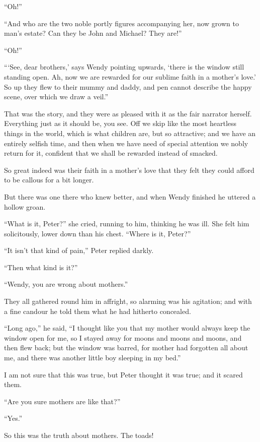 ``Oh!''

``And who are the two noble portly figures accompanying her, now grown
to man's estate? Can they be John and Michael? They are!''

``Oh!''

``‘See, dear brothers,' says Wendy pointing upwards, ‘there is the
window still standing open. Ah, now we are rewarded for our sublime
faith in a mother's love.' So up they flew to their mummy and daddy,
and pen cannot describe the happy scene, over which we draw a veil.''

That was the story, and they were as pleased with it as the fair
narrator herself. Everything just as it should be, you see. Off we skip
like the most heartless things in the world, which is what children
are, but so attractive; and we have an entirely selfish time, and then
when we have need of special attention we nobly return for it,
confident that we shall be rewarded instead of smacked.

So great indeed was their faith in a mother's love that they felt they
could afford to be callous for a bit longer.

But there was one there who knew better, and when Wendy finished he
uttered a hollow groan.

``What is it, Peter?'' she cried, running to him, thinking he was ill.
She felt him solicitously, lower down than his chest. ``Where is it,
Peter?''

``It isn't that kind of pain,'' Peter replied darkly.

``Then what kind is it?''

``Wendy, you are wrong about mothers.''

They all gathered round him in affright, so alarming was his agitation;
and with a fine candour he told them what he had hitherto concealed.

``Long ago,'' he said, ``I thought like you that my mother would always
keep the window open for me, so I stayed away for moons and moons and
moons, and then flew back; but the window was barred, for mother had
forgotten all about me, and there was another little boy sleeping in my
bed.''

I am not sure that this was true, but Peter thought it was true; and it
scared them.

``Are you sure mothers are like that?''

``Yes.''

So this was the truth about mothers. The toads!

